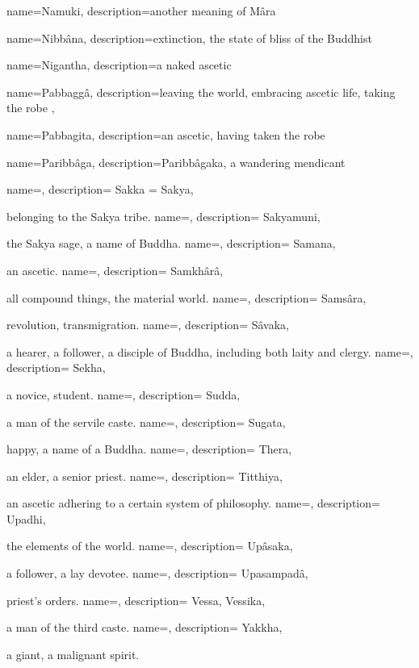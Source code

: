 \newglossaryentry{}
{
  name=Namuki,
 description=another meaning of Mâra
}

\newglossaryentry{}
{
  name=Nibbâna,
 description=extinction, the state of bliss of the Buddhist
}

\newglossaryentry{}
{
  name=Nigantha,
 description=a naked ascetic
}

\newglossaryentry{}
{
  name=Pabbaggâ,
 description=leaving the world, embracing ascetic life, taking the robe
}
,
	


\newglossaryentry{}
{
  name=Pabbagita,
 description=an ascetic, having taken the robe
}

\newglossaryentry{}
{
  name=Paribbâga,
 description=Paribbâgaka, a wandering mendicant
}

\newglossaryentry{}
{
  name=,
 description=
}
Sakka = Sakya,
	

belonging to the Sakya tribe.
\newglossaryentry{}
{
  name=,
 description=
}
Sakyamuni,
	

the Sakya sage, a name of Buddha.
\newglossaryentry{}
{
  name=,
 description=
}
Samana,
	

an ascetic.
\newglossaryentry{}
{
  name=,
 description=
}
Samkhârâ,
	

all compound things, the material world.
\newglossaryentry{}
{
  name=,
 description=
}
Samsâra,
	

revolution, transmigration.
\newglossaryentry{}
{
  name=,
 description=
}
Sâvaka,
	

a hearer, a follower, a disciple of Buddha, including both laity and clergy.
\newglossaryentry{}
{
  name=,
 description=
}
Sekha,
	

a novice, student.
\newglossaryentry{}
{
  name=,
 description=
}
Sudda,
	

a man of the servile caste.
\newglossaryentry{}
{
  name=,
 description=
}
Sugata,
	

happy, a name of a Buddha.
\newglossaryentry{}
{
  name=,
 description=
}
Thera,
	

an elder, a senior priest.
\newglossaryentry{}
{
  name=,
 description=
}
Titthiya,
	

an ascetic adhering to a certain system of philosophy.
\newglossaryentry{}
{
  name=,
 description=
}
Upadhi,
	

the elements of the world.
\newglossaryentry{}
{
  name=,
 description=
}
Upâsaka,
	

a follower, a lay devotee.
\newglossaryentry{}
{
  name=,
 description=
}
Upasampadâ,
	

priest's orders.
\newglossaryentry{}
{
  name=,
 description=
}
Vessa, Vessika,
	

a man of the third caste.
\newglossaryentry{}
{
  name=,
 description=
}
Yakkha,
	

a giant, a malignant spirit.